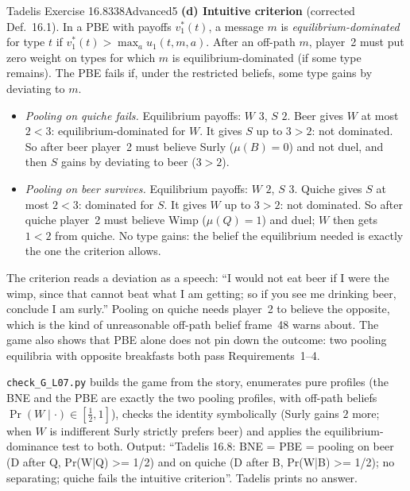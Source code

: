\begin{exsol}{Tadelis Exercise 16.8}{338}{Advanced}{5}
\textbf{(d) Intuitive criterion} (corrected Def.~16.1). In a PBE with payoffs $v_1^*(t)$, a message $m$ is
\emph{equilibrium-dominated} for type $t$ if $v_1^*(t) > \max_a u_1(t, m, a)$. After an off-path $m$, player~2
must put zero weight on types for which $m$ is equilibrium-dominated (if some type remains). The PBE fails if,
under the restricted beliefs, some type gains by deviating to $m$.
\begin{itemize}
  \item \emph{Pooling on quiche fails.} Equilibrium payoffs: $W$ $3$, $S$ $2$. Beer gives $W$ at most $2 < 3$:
  equilibrium-dominated for $W$. It gives $S$ up to $3 > 2$: not dominated. So after beer player~2 must believe
  Surly ($\mu(B) = 0$) and not duel, and then $S$ gains by deviating to beer ($3 > 2$).
  \item \emph{Pooling on beer survives.} Equilibrium payoffs: $W$ $2$, $S$ $3$. Quiche gives $S$ at most $2 < 3$:
  dominated for $S$. It gives $W$ up to $3 > 2$: not dominated. So after quiche player~2 must believe Wimp
  ($\mu(Q) = 1$) and duel; $W$ then gets $1 < 2$ from quiche. No type gains: the belief the equilibrium needed
  is exactly the one the criterion allows.
\end{itemize}

\interp The criterion reads a deviation as a speech: ``I would not eat beer if I were the wimp, since that cannot
beat what I am getting; so if you see me drinking beer, conclude I am surly.'' Pooling on quiche needs player~2 to
believe the opposite, which is the kind of unreasonable off-path belief frame~48 warns about. The game also shows
that PBE alone does not pin down the outcome: two pooling equilibria with opposite breakfasts both pass
Requirements~1--4.

\verify \texttt{check\_G\_L07.py} builds the game from the story, enumerates pure profiles (the BNE and the PBE are
exactly the two pooling profiles, with off-path beliefs $\Pr(W \mid \cdot) \in [\frac12, 1]$), checks the identity
symbolically (Surly gains $2$ more; when $W$ is indifferent Surly strictly prefers beer) and applies the
equilibrium-dominance test to both. Output: ``Tadelis 16.8: BNE = PBE = pooling on beer (D after Q, Pr(W|Q) >= 1/2)
and on quiche (D after B, Pr(W|B) >= 1/2); no separating; quiche fails the intuitive criterion''. Tadelis prints no
answer.


\end{exsol}
